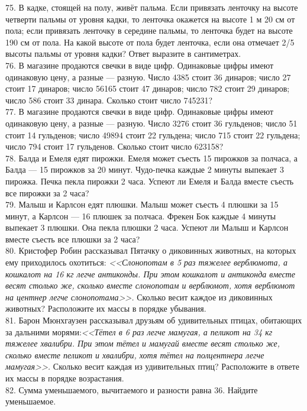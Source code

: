75. В кадке, стоящей на полу, живёт пальма. Если привязать ленточку на высоте четверти пальмы от уровня кадки, то ленточка окажется на высоте 1 м 20 см от пола; если привязать ленточку в середине пальмы, то ленточка будет на высоте 190 см от пола. На какой высоте от пола будет ленточка, если она отмечает 2/5 высоты пальмы от уровня кадки? Ответ выразите в сантиметрах.\\
76. В магазине продаются свечки в виде цифр. Одинаковые цифры имеют одинаковую цену, а разные --- разную. Число 4385 стоит 36 динаров; число 27 стоит 17 динаров; число 56165 стоит 47 динаров; число 782 стоит 29 динаров; число 586 стоит 33 динара. Сколько стоит число 745231?\\
77. В магазине продаются свечки в виде цифр. Одинаковые цифры имеют одинаковую цену, а разные --- разную. Число 3276 стоит 36 гульденов; число 51 стоит 14 гульденов; число 49894 стоит 22 гульдена; число 715 стоит 22 гульдена; число 794 стоит 17 гульденов. Сколько стоит число 623158?\\
78. Балда и Емеля едят пирожки. Емеля может съесть 15 пирожков за полчаса, а Балда --- 15 пирожков за 20 минут. Чудо-печка каждые 2 минуты выпекает 3 пирожка. Печка пекла пирожки 2 часа. Успеют ли Емеля и Балда вместе съесть все пирожки за 2 часа?\\
79. Малыш и Карлсон едят плюшки. Малыш может съесть 4 плюшки за 15 минут, а Карлсон --- 16 плюшек за полчаса. Фрекен Бок каждые 4 минуты выпекает 3 плюшки. Она пекла плюшки 2 часа. Успеют ли Малыш и Карлсон вместе съесть все плюшки за 2 часа?\\
80. Кристофер Робин рассказывал Пятачку о диковинных животных, на которых ему приходилось охотиться: {\it <<Слонопотам в 5 раз тяжелее верблюмота, а кошкалот на 16 кг легче антиконды. При этом кошкалот и антиконда вместе весят столько же, сколько вместе слонопотам и верблюмот, хотя верблюмот на центнер легче слонопотама>>.} Сколько весит каждое из диковинных животных? Расположите их массы в порядке убывания.\\
81. Барон Мюнхгаузен рассказывал друзьям об удивительных птицах, обитающих за дальними морями:{\it <<Тётел в 6 раз легче мамугая, а пеликот на 34 кг тяжелее хвалибри. При этом тётел и мамугай вместе весят столько же, сколько вместе пеликот и хвалибри, хотя тётел на полцентнера легче мамугая>>.} Сколько весит каждая из удивительных птиц? Расположите в ответе их массы в порядке возрастания.\\
82. Сумма уменьшаемого, вычитаемого и разности равна 36. Найдите уменьшаемое.\\
